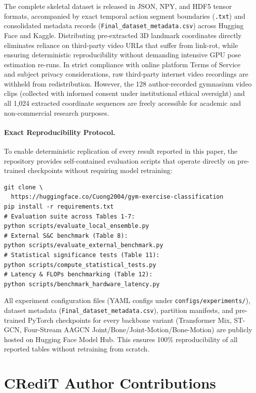 \documentclass[runningheads]{llncs}
\begin{document}
The complete skeletal dataset is released in JSON, NPY, and HDF5 tensor formats, accompanied by exact temporal action segment boundaries (\texttt{.txt}) and consolidated metadata records (\texttt{Final\_dataset\_metadata.csv}) across Hugging Face and Kaggle. Distributing pre-extracted 3D landmark coordinates directly eliminates reliance on third-party video URLs that suffer from link-rot, while ensuring deterministic reproducibility without demanding intensive GPU pose estimation re-runs. In strict compliance with online platform Terms of Service and subject privacy considerations, raw third-party internet video recordings are withheld from redistribution. However, the 128 author-recorded gymnasium video clips (collected with informed consent under institutional ethical oversight) and all 1,024 extracted coordinate sequences are freely accessible for academic and non-commercial research purposes.

\paragraph{Exact Reproducibility Protocol.} To enable deterministic replication of every result reported in this paper, the repository provides self-contained evaluation scripts that operate directly on pre-trained checkpoints without requiring model retraining:
\begin{footnotesize}
\begin{verbatim}
git clone \
  https://huggingface.co/Cuong2004/gym-exercise-classification
pip install -r requirements.txt
# Evaluation suite across Tables 1-7:
python scripts/evaluate_local_ensemble.py
# External S&C benchmark (Table 8):
python scripts/evaluate_external_benchmark.py
# Statistical significance tests (Table 11):
python scripts/compute_statistical_tests.py
# Latency & FLOPs benchmarking (Table 12):
python scripts/benchmark_hardware_latency.py
\end{verbatim}
\end{footnotesize}
All experiment configuration files (YAML configs under \texttt{configs/experiments/}), dataset metadata (\texttt{Final\_dataset\_metadata.csv}), partition manifests, and pre-trained PyTorch checkpoints for every backbone variant (Transformer Mix, ST-GCN, Four-Stream AAGCN Joint/Bone/Joint-Motion/Bone-Motion) are publicly hosted on Hugging Face Model Hub. This ensures 100\% reproducibility of all reported tables without retraining from scratch.

\section*{CRediT Author Contributions}
\end{document}
